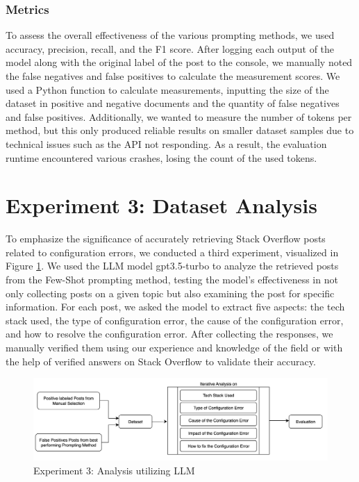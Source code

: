 \documentclass[english,bachelor]{swsLeipzig}
\begin{document}
\subsubsection{Metrics}
To assess the overall effectiveness of the various prompting methods, we used accuracy, precision, recall, and the F1 score. After logging each output of the model along with the original label of the post to the console, we manually noted the false negatives and false positives to calculate the measurement scores. We used a Python function to calculate measurements, inputting the size of the dataset in positive and negative documents and the quantity of false negatives and false positives. Additionally, we wanted to measure the number of tokens per method, but this only produced reliable results on smaller dataset samples due to technical issues such as the API not responding. As a result, the evaluation runtime encountered various crashes, losing the count of the used tokens.

\section{Experiment 3: Dataset Analysis}

To emphasize the significance of accurately retrieving Stack Overflow posts related to configuration 
errors, we conducted a third experiment, visualized in Figure \ref{fig:figure44}. We used the LLM model gpt3.5-turbo to analyze the retrieved posts from the Few-Shot prompting method, testing the model's effectiveness in not only collecting posts on a given topic but also examining the post for specific information. For each post, we asked the model to extract five aspects: the tech stack used, the type of configuration error, the cause of the configuration error, and how to resolve the configuration error. After collecting the responses, we manually verified them using our experience and knowledge of the field or with the help of verified answers on Stack Overflow to validate their accuracy.

\begin{figure}[h]
  \includegraphics[width=1\textwidth]{images/figure4.png}
  \caption{Experiment 3: Analysis utilizing LLM}
  \label{fig:figure44}
\end{figure}
\end{document}
